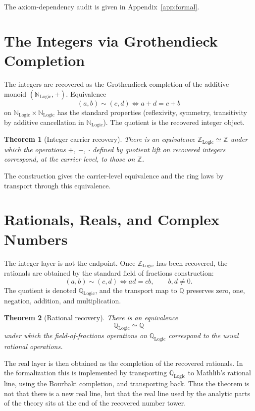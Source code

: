\documentclass[11pt,a4paper]{article}
\newtheorem{theorem}{Theorem}
\theoremstyle{definition}
\theoremstyle{remark}
\begin{document}
The axiom-dependency audit is given in Appendix~\ref{app:formal}.

\section{The Integers via Grothendieck Completion}
\label{sec:integers}

The integers are recovered as the Grothendieck completion of the
additive monoid $(\mathbb{N}_{\mathrm{Logic}}, +)$. Equivalence
\[
(a, b) \sim (c, d) \iff a + d = c + b
\]
on $\mathbb{N}_{\mathrm{Logic}} \times \mathbb{N}_{\mathrm{Logic}}$ has the standard
properties (reflexivity, symmetry, transitivity by additive
cancellation in $\mathbb{N}_{\mathrm{Logic}}$). The quotient is the
recovered integer object.

\begin{theorem}[Integer carrier recovery]
There is an equivalence $\mathbb{Z}_{\mathrm{Logic}} \simeq \mathbb{Z}$
under which the operations $+$, $-$, $\cdot$ defined by quotient lift
on recovered integers correspond, at the carrier level, to those on
$\mathbb{Z}$.
\end{theorem}

The construction gives the carrier-level equivalence and the ring
laws by transport through this equivalence.

\section{Rationals, Reals, and Complex Numbers}
\label{sec:tower}

The integer layer is not the endpoint. Once $\mathbb{Z}_{\mathrm{Logic}}$
has been recovered, the rationals are obtained by the standard field of
fractions construction:
\[
(a,b) \sim (c,d) \iff a d = c b,\qquad b,d\neq 0.
\]
The quotient is denoted $\mathbb{Q}_{\mathrm{Logic}}$, and the transport
map to $\mathbb{Q}$ preserves zero, one, negation, addition, and
multiplication.

\begin{theorem}[Rational recovery]
There is an equivalence
\[
\mathbb{Q}_{\mathrm{Logic}} \simeq \mathbb{Q}
\]
under which the field-of-fractions operations on
$\mathbb{Q}_{\mathrm{Logic}}$ correspond to the usual rational
operations.
\end{theorem}

The real layer is then obtained as the completion of the recovered
rationals. In the formalization this is implemented by transporting
$\mathbb{Q}_{\mathrm{Logic}}$ to Mathlib's rational line, using the
Bourbaki completion, and transporting back. Thus the theorem is not that
there is a new real line, but that the real line used by the analytic
parts of the theory sits at the end of the recovered number tower.
\end{document}
